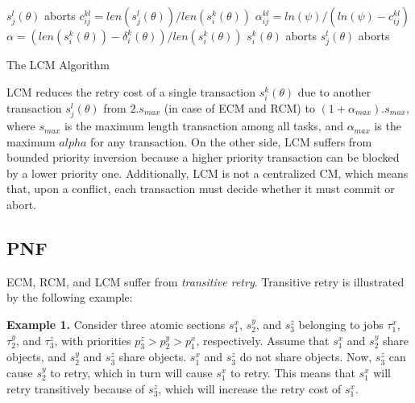 \documentclass[prodmode,acmtecs]{acmsmall}
\begin{document}
\begin{algorithm}
\footnotesize{
\LinesNumbered
{}
	{$s_j^l(\theta)$ aborts\label{step_sicommits}\;}
	{$c_{ij}^{kl}=len(s_j^l(\theta))/len(s_i^k(\theta))$\label{step_cijkl}\;
	$\alpha_{ij}^{kl}=ln(\psi)/(ln(\psi)-c_{ij}^{kl})$\label{step_alphaijkl}\;
	$\alpha=\left(len(s_i^k(\theta))-\delta_i^k(\theta)\right)/len(s_i^k(\theta))$\;
	{$s_i^k(\theta)$ aborts\label{step_siaborts}\;}
	{$s_j^l(\theta)$ aborts\label{step_sjaborts}\;}
	}
	}
\caption{The LCM Algorithm}
\label{alg_lcm}
\end{algorithm}

LCM reduces the retry cost of a single transaction $s_i^k(\theta)$ due to another transaction $s_j^l(\theta)$ from $2.s_{max}$ (in case of ECM and RCM) to $(1+\alpha_{max}).s_{max}$, where $s_{max}$ is the maximum length transaction among all tasks, and $\alpha_{max}$ is the maximum $alpha$ for any transaction. On the other side, 
LCM suffers from bounded priority inversion because a higher priority transaction can be blocked by a lower priority one. Additionally, LCM is not a centralized CM, which means that, upon a conflict, each transaction must decide whether it must commit or abort. 


\subsection{PNF}
\label{pnf overview}

ECM, RCM, and LCM suffer from \textit{transitive retry}. Transitive retry is illustrated by the following example:

\textbf{Example 1.} 
Consider three atomic sections $s_{1}^{x}$, $s_{2}^{y}$, 
and $s_{3}^{z}$ belonging to jobs $\tau_{1}^{x}$, $\tau_{2}^{y}$, 
and $\tau_{3}^{z}$, with priorities $p_{3}^{z}>p_{2}^{y}>p_{1}^{x}$, respectively. 
Assume that $s_{1}^{x}$ and $s_{2}^{y}$ share objects, and $s_{2}^{y}$ and $s_{3}^{z}$ share objects. $s_{1}^{x}$ and $s_{3}^{z}$ do not share objects.
Now, $s_{3}^{z}$ can cause $s_{2}^{y}$ to retry, which in turn will cause $s_{1}^{x}$ to retry. This means that $s_{1}^{x}$ will retry transitively
because of $s_{3}^{z}$, which will increase the retry cost of $s_{1}^{x}$.
\end{document}
